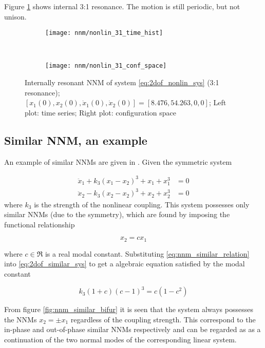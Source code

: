 Figure \ref{fig:nonlin_3:1_int_resonance} shows internal 3:1 resonance. The
motion is still periodic, but not unison.

\begin{figure}[!ht]
  \centering
  \begin{subfigure}[b]{0.45\textwidth}
    \texttt{[image: nnm/nonlin\_31\_time\_hist]}
  \end{subfigure}
  ~
  \begin{subfigure}[b]{0.45\textwidth}
    \texttt{[image: nnm/nonlin\_31\_conf\_space]}
  \end{subfigure}
  \caption{Internally resonant NNM of system \eqref{eq:2dof_nonlin_sys} (3:1
    resonance);
    $[x_1(0), x_2(0), \dot x_1(0), \dot x_2(0)] = [8.476, 54.263, 0, 0]$;
    Left plot: time series;
    Right plot: configuration space}
  \label{fig:nonlin_3:1_int_resonance}
\end{figure}




\subsection{Similar NNM, an example}
\label{sec:similar-nnm-an}


An example of similar NNMs are given in \citep{vakakis1992a}.
Given the symmetric system

\begin{align}
    \ddot x_1 + k_3(x_1 - x_2)^3 + x_1 + x_1^3&= 0 \nonumber \\
    \ddot x_2 - k_3(x_2 - x_2)^3 + x_2 + x_2^3&= 0 \label{eq:2dof_similar_sys}
\end{align}
where $k_3$ is the strength of the nonlinear coupling.
This system possesses only similar NNMs (due to the symmetry), which are found
by imposing the functional relationship

\begin{equation}
  \label{eq:nnm_similar_relation}
  x_2 = c x_1
\end{equation}

where $c \in \Re$ is a real modal constant. Substituting
\eqref{eq:nnm_similar_relation} into \eqref{eq:2dof_similar_sys} to get a
algebraic equation satisfied by the modal constant

\begin{equation}
  \label{eq:nmm_similar_modal}
  k_3(1+c)(c-1)^3 = c(1-c^2)
\end{equation}

From figure \ref{fig:nnm_similar_bifur} it is seen that the system always
possesses the NNMs $x_2 = \pm x_1$ regardless of the coupling strength. This
correspond to the in-phase and out-of-phase similar NNMs respectively and can
be regarded as as a continuation of the two normal modes of the corresponding
linear system.


